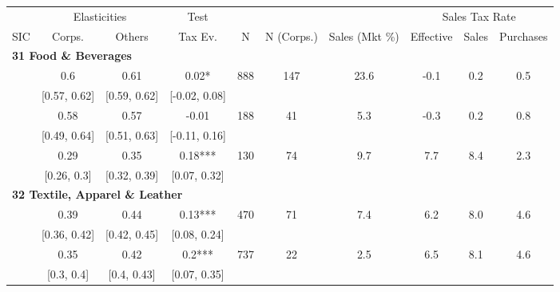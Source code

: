 \documentclass[
  12pt]{article}
\theoremstyle{definition}
\theoremstyle{remark}
\begin{document}
\begin{table}
{\centering
\begin{tabular}[t]{c|c|c|c|c|c|c|c|c|c}
\hline
\multicolumn{1}{c|}{ } & \multicolumn{2}{c|}{Elasticities} & \multicolumn{1}{c|}{Test} & \multicolumn{3}{c|}{ } & \multicolumn{3}{c}{Sales Tax Rate} \\
\cline{2-3} \cline{4-4} \cline{8-10}
SIC & Corps. & Others & Tax Ev. & N & N (Corps.) & Sales (Mkt \%) & Effective & Sales & Purchases\\
\hline
\multicolumn{10}{l}{\textbf{31 Food \& Beverages}}\\
\hline
\hspace{1em} & 0.6 & 0.61 & 0.02* & 888 & 147 & 23.6 & -0.1 & 0.2 & 0.5\\
\cline{2-10}
\hspace{1em}\multirow[t]{-2}{*}{\centering\arraybackslash 311} & [0.57, 0.62] & [0.59, 0.62] & [-0.02, 0.08] &  &  &  &  &  & \\
\cline{1-10}
\hspace{1em} & 0.58 & 0.57 & -0.01 & 188 & 41 & 5.3 & -0.3 & 0.2 & 0.8\\
\cline{2-10}
\hspace{1em}\multirow[t]{-2}{*}{\centering\arraybackslash 312} & [0.49, 0.64] & [0.51, 0.63] & [-0.11, 0.16] &  &  &  &  &  & \\
\cline{1-10}
\hspace{1em} & 0.29 & 0.35 & 0.18*** & 130 & 74 & 9.7 & 7.7 & 8.4 & 2.3\\
\cline{2-10}
\hspace{1em}\multirow[t]{-2}{*}{\centering\arraybackslash 313} & [0.26, 0.3] & [0.32, 0.39] & [0.07, 0.32] &  &  &  &  &  & \\
\cline{1-10}
\multicolumn{10}{l}{\textbf{32 Textile, Apparel \& Leather}}\\
\hline
\hspace{1em} & 0.39 & 0.44 & 0.13*** & 470 & 71 & 7.4 & 6.2 & 8.0 & 4.6\\
\cline{2-10}
\hspace{1em}\multirow[t]{-2}{*}{\centering\arraybackslash 321} & [0.36, 0.42] & [0.42, 0.45] & [0.08, 0.24] &  &  &  &  &  & \\
\cline{1-10}
\hspace{1em} & 0.35 & 0.42 & 0.2*** & 737 & 22 & 2.5 & 6.5 & 8.1 & 4.6\\
\cline{2-10}
\hspace{1em}\multirow[t]{-2}{*}{\centering\arraybackslash 322} & [0.3, 0.4] & [0.4, 0.43] & [0.07, 0.35] &  &  &  &  &  & \\

\end{tabular}}
\end{table}
\end{document}
